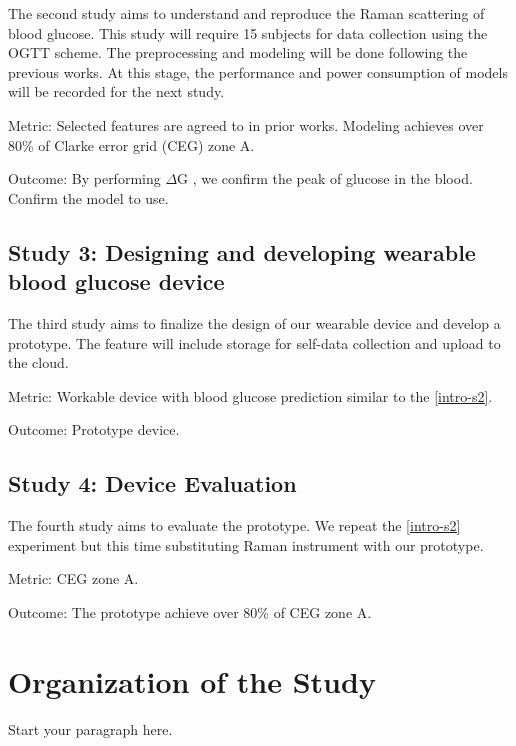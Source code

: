 The second study aims to understand and reproduce the Raman scattering of blood glucose.
This study will require 15 subjects for data collection using the OGTT scheme.
The preprocessing and modeling will be done following the previous works.
At this stage, the performance and power consumption of models will be recorded for the next study.

Metric: Selected features are agreed to in prior works. Modeling achieves over 80\% of Clarke error grid (CEG) zone A.

Outcome: By performing $\Delta$G \citep{directGlucose}, we confirm the peak of glucose in the blood. Confirm the model to use.

\subsection{Study 3: Designing and developing wearable blood glucose device}

The third study aims to finalize the design of our wearable device and develop a prototype.
The feature will include storage for self-data collection and upload to the cloud.

Metric: Workable device with blood glucose prediction similar to the \ref{intro-s2}.

Outcome: Prototype device.

\subsection{Study 4: Device Evaluation}

The fourth study aims to evaluate the prototype.
We repeat the \ref{intro-s2} experiment but this time substituting Raman instrument with our prototype.

Metric: CEG zone A.

Outcome: The prototype achieve over 80\% of CEG zone A.

\section{Organization of the Study}
Start your paragraph here.